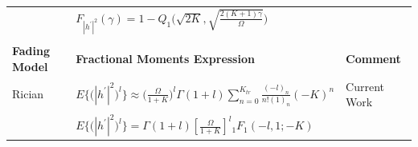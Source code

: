 \begin{table}[]
{\begin{tabular}{lll}
											&	$F_{|h^{'}|^2}(\gamma)=1-Q_1\Big( \sqrt{2K}, \sqrt{\frac{2(K+1)\gamma}{\Omega}}\Big)$ 																									& \cite{rached2017unified} 	\\
											&																																																																					&														\\ \hline
\textbf{Fading Model}	& \textbf{Fractional Moments Expression}																																																	& \textbf{Comment}					\\ \hline \hline
Rician 								& $E\big\{\big({|h^{'}|^2}\big)^l\big\} \approx \Big(\frac{\Omega}{1+K}\Big)^l \Gamma(1+l) \sum_{n=0}^{K_{tr}} \frac{(-l)_n}{n!(1)_n}(-K)^n$ & Current Work 					\\
											&	$E\big\{\big({|h^{'}|^2}\big)^l\big\} = \Gamma(1+l) \left[\frac{\Omega}{1+K}\right]^{l} {}_1{F_1}(-l,1;-K)$ 														& \cite{rached2017unified} 	\\ \hline
\end{tabular}}
\end{table}


